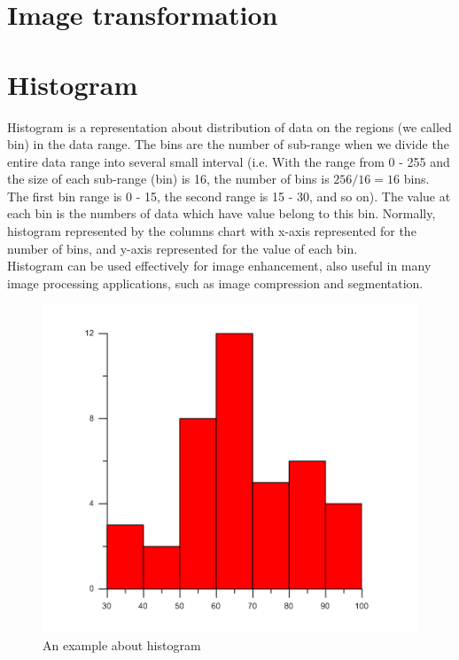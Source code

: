 \section{Image transformation}
\section{Histogram}
Histogram is a representation about distribution of data on the regions (we called bin) in the data range. The bins are the number of sub-range when we divide the entire data range into several small interval (i.e. With the range from 0 - 255 and the size of each sub-range (bin) is 16, the number of bins is $256/16 = 16$ bins. The first bin range is 0 - 15, the second range is 15 - 30, and so on). The value at each bin is the numbers of data which have value belong to this bin. Normally, histogram represented by the columns chart with x-axis represented for the number of bins, and y-axis represented for the value of each bin.\\
Histogram can be used effectively for image enhancement, also useful in many image processing applications, such as image compression and segmentation.\\
\begin{figure}[h!]
\centering
\includegraphics[scale=2]{images/histogram}
\caption{An example about histogram}
\label{fig:figure_31}
\end{figure}
